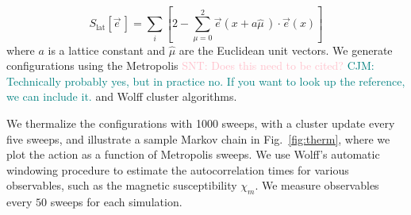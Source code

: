 \documentclass[a4paper,11pt]{article}
\newcommand{\e}{\vec e}
\newcommand\chris[1]{\textcolor{teal}{CJM: #1}}
\newcommand\stuart[1]{\textcolor{pink}{SNT: #1}}
\begin{document}
\begin{equation}
    \label{eq:nlsm discretized action}
    S_\mathrm{lat}[\e\,] = \sum_i \left[ 2 - \sum_{\mu=0}^{2}\e(x+a\hat{\mu}\,)\cdot\e(x)  \right]
\end{equation}
where $a$ is a lattice constant and $\hat \mu$ are the Euclidean unit vectors. We generate configurations using the Metropolis \stuart{Does this need to be cited?} \chris{Technically probably yes, but in practice no. If you want to look up the reference, we can include it.} and Wolff cluster \cite{wolff1989} algorithms.

We thermalize the configurations with 1000 sweeps, with a cluster update every five sweeps, and illustrate a sample Markov chain in Fig.~\ref{fig:therm}, where we plot the action as a function of Metropolis sweeps. We use Wolff's automatic windowing procedure \cite{wolff2007} to estimate the autocorrelation times for various observables, such as the magnetic susceptibility $\chi_m$. We measure observables every $50$ sweeps for each simulation.
\end{document}

